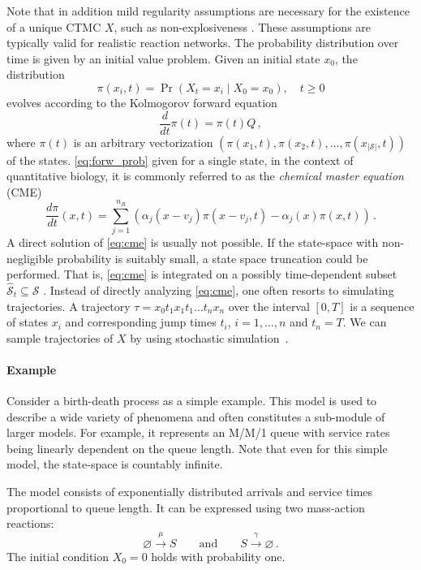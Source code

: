 Note that in addition mild regularity assumptions
are   necessary for the existence of a unique \ac{CTMC} $X$, such as non-explosiveness \cite{anderson2012continuous}.
These assumptions  are  typically
valid for realistic reaction networks.
The probability distribution over time is given by an
initial value problem.
Given an initial state $x_0$, the distribution
\begin{equation}\label{eq:forw_prob}
\pi(x_i, t)=\Pr(X_t=x_i\mid X_0=x_0),\quad t\geq 0
\end{equation}
evolves according to the Kolmogorov forward equation
\begin{equation}\label{eq:forward}
\frac{d}{dt}\pi(t) = \pi(t) Q\,,
\end{equation}
where $\pi(t)$ is an arbitrary vectorization $(\pi(x_1,t), \pi(x_2,t),\dots,\pi(x_{|\mathcal{S}|},t))$ of the states.
\eqref{eq:forw_prob} given for a single state, in the context of quantitative biology, it is commonly referred to
as the \emph{chemical master equation} (CME)
\begin{equation}\label{eq:cme}
    \frac{d\pi}{d t} ( x,t) =
    \sum_{j=1}^{n_R}\left(
        \alpha_j( x- v_j)\pi( x- v_j,t) - \alpha_j( x)\pi( x,t)
    \right)\,.
\end{equation}
A direct solution of \eqref{eq:cme} is usually not possible.
If the state-space with non-negligible probability is suitably small, a state space
truncation could be performed. That is, \eqref{eq:cme} is integrated on a possibly time-dependent subset
$\hat{\mathcal{S}}_t\subseteq\mathcal{S}$ \cite{henzinger2009sliding,munsky2006finite,spieler2014numerical}.
Instead of directly analyzing \eqref{eq:cme}, one often resorts to simulating trajectories.
A trajectory $\tau=x_0t_1x_1t_1\dots t_n x_n$ over the interval $[0,T]$ is a sequence of states $x_i$
and corresponding
jump times $t_i$, $i=1,\dots,n$ and $t_n=T$.
We can sample trajectories of $X$ by using stochastic simulation~\cite{gillespie1977exact}.

\paragraph{Example} Consider a birth-death process as a simple example. This model is used to describe a wide variety of phenomena and often constitutes a sub-module of larger models.
For example, it represents an M/M/1 queue with service rates being linearly dependent on the queue length.
Note that even for this simple model, the state-space is countably infinite.
\begin{model}\label{model:bd}
The model consists of exponentially distributed arrivals and service times proportional to queue length. It can be expressed using two mass-action reactions:
$$ \varnothing \xrightarrow{\mu} S \qquad\text{and}\qquad S \xrightarrow{\gamma} \varnothing\,.$$
The initial condition $X_0=0$ holds with probability one.
\end{model}

